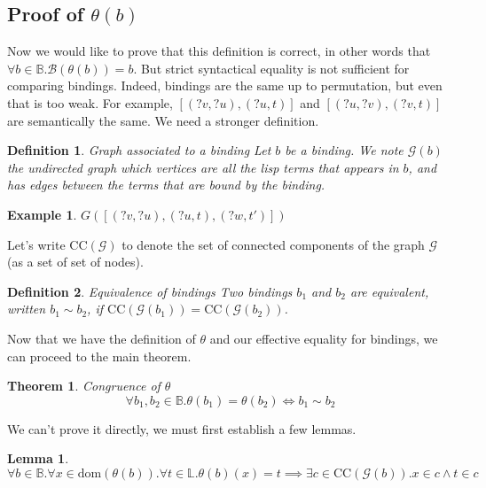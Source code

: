\documentclass[]{article}
\newcommand{\B}{\mathscr{B}}
\newcommand{\G}{\mathscr{G}}
\newcommand{\1}{\mathbbm{1}}
\newcommand{\0}{\mathbbm{0}}
\newtheorem{theo}{Theorem}
\newtheorem{lem}{Lemma}
\newtheorem{defi}{Definition}
\newtheorem{ex}{Example}
\newcommand{\dom}{\text{dom}}
\begin{document}
\subsection{Proof of $\theta(b)$}

Now we would like to prove that this definition is correct, in other words that
$\forall b\in\mathbb{B}. \B(\theta(b)) = b$. But strict syntactical equality is not
sufficient for comparing bindings. Indeed, bindings are the same up to permutation, but
even that is too weak. For example, $[(?v, ?u), (?u, t)]$ and $[(?u, ?v), (?v, t)]$
are semantically the same. We need a stronger definition.

\begin{defi}{Graph associated to a binding}
    Let $b$ be a binding. We note $\G(b)$ the undirected graph which vertices
    are all the lisp terms that appears in $b$, and has edges between the terms
    that are bound by the binding.
\end{defi}

\begin{ex}{$G([(?v,?u), (?u,t), (?w,t')])$}
    \newline
    \begin{center}
        
    \end{center}
\end{ex}

Let's write $\text{CC}(\G)$ to denote the set of connected components of the
graph $\G$ (as a set of set of nodes).

\begin{defi}{Equivalence of bindings}
    Two bindings $b_1$ and $b_2$ are equivalent, written $b_1\sim b_2$,
    if $\text{CC}(\G(b_1)) = \text{CC}(\G(b_2))$.
\end{defi}

Now that we have the definition of $\theta$ and our effective equality
for bindings, we can proceed to the main theorem.

\begin{theo}{Congruence of $\theta$}\label{theta-congru}
    \[\forall b_1,b_2\in\mathbb{B}.
    \theta(b_1) = \theta(b_2)\iff b_1\sim b_2\]
\end{theo}

We can't prove it directly, we must first establish a few lemmas.

\begin{lem}\label{image_connected}
    \[\forall b\in\mathbb{B}. \forall x\in\dom(\theta(b)). \forall t\in\mathbb{L}.
    \theta(b)(x) = t
    \implies\exists c\in\text{CC}(\G(b)). x\in c\wedge t\in c\]
\end{lem}
\end{document}
